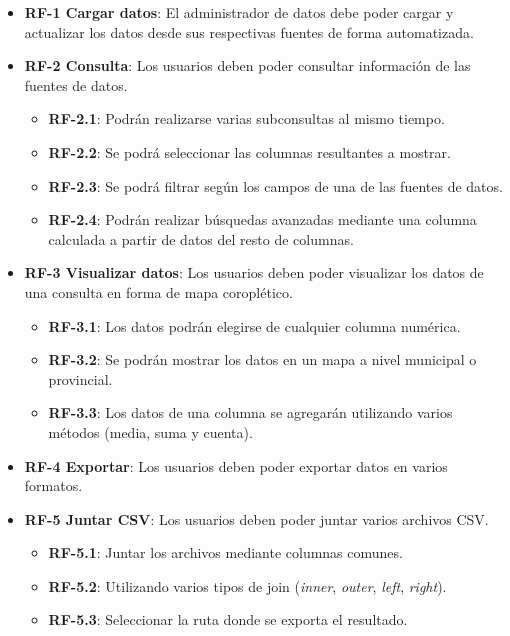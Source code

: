 \begin{itemize}
	\item \textbf{RF-1 Cargar datos}: El administrador de datos debe poder cargar y actualizar los datos desde sus respectivas fuentes de forma automatizada.
	\item \textbf{RF-2 Consulta}: Los usuarios deben poder consultar información de las fuentes de datos.
	\begin{itemize}
		\item \textbf{RF-2.1}: Podrán realizarse varias subconsultas al mismo tiempo.
		\item \textbf{RF-2.2}: Se podrá seleccionar las columnas resultantes a mostrar.
		\item \textbf{RF-2.3}: Se podrá filtrar según los campos de una de las fuentes de datos.
		\item \textbf{RF-2.4}: Podrán realizar búsquedas avanzadas mediante una columna calculada a partir de datos del resto de columnas.
	\end{itemize}
	\item \textbf{RF-3 Visualizar datos}: Los usuarios deben poder visualizar los datos de una consulta en forma de mapa coroplético.
	\begin{itemize}
		\item \textbf{RF-3.1}: Los datos podrán elegirse de cualquier columna numérica.
		\item \textbf{RF-3.2}: Se podrán mostrar los datos en un mapa a nivel municipal o provincial.
		\item \textbf{RF-3.3}: Los datos de una columna se agregarán utilizando varios métodos (media, suma y cuenta).
	\end{itemize}
	\item \textbf{RF-4 Exportar}: Los usuarios deben poder exportar datos en varios formatos.
	\item \textbf{RF-5 Juntar CSV}: Los usuarios deben poder juntar varios archivos CSV.
		\begin{itemize}
		\item \textbf{RF-5.1}: Juntar los archivos mediante columnas comunes.
		\item \textbf{RF-5.2}: Utilizando varios tipos de join (\textit{inner}, \textit{outer}, \textit{left}, \textit{right}).
		\item \textbf{RF-5.3}: Seleccionar la ruta donde se exporta el resultado.
	\end{itemize}
\end{itemize}

